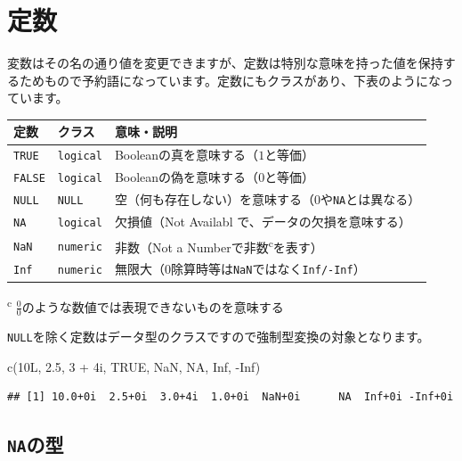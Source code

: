 \documentclass[
  12pt,
]{book}
\newenvironment{Shaded}{\begin{snugshade}}{\end{snugshade}}
\newcommand{\ConstantTok}[1]{\textcolor[rgb]{0.00,0.00,0.00}{#1}}
\newcommand{\DecValTok}[1]{\textcolor[rgb]{0.00,0.00,0.81}{#1}}
\newcommand{\FloatTok}[1]{\textcolor[rgb]{0.00,0.00,0.81}{#1}}
\newcommand{\FunctionTok}[1]{\textcolor[rgb]{0.00,0.00,0.00}{#1}}
\newcommand{\NormalTok}[1]{#1}
\newcommand{\SpecialCharTok}[1]{\textcolor[rgb]{0.00,0.00,0.00}{#1}}
\begin{document}
\hypertarget{ux5b9aux6570}{%
\section{定数}\label{ux5b9aux6570}}

変数はその名の通り値を変更できますが、定数は特別な意味を持った値を保持するためもので予約語になっています。定数にもクラスがあり、下表のようになっています。

\begin{longtable}[]{@{}lll@{}}
\toprule
定数 & クラス & 意味・説明 \\
\midrule
\endhead
\texttt{TRUE} & \texttt{logical} & Booleanの真を意味する（\(1\)と等価） \\
\texttt{FALSE} & \texttt{logical} & Booleanの偽を意味する（\(0\)と等価） \\
\texttt{NULL} & \texttt{NULL} & 空（何も存在しない）を意味する（\(0\)や\texttt{NA}とは異なる） \\
\texttt{NA} & \texttt{logical} & 欠損値（Not Availabl で、データの欠損を意味する） \\
\texttt{NaN} & \texttt{numeric} & 非数（Not a Numberで非数\textsuperscript{c}を表す） \\
\texttt{Inf} & \texttt{numeric} & 無限大（\(0\)除算時等は\texttt{NaN}ではなく\texttt{Inf/-Inf}） \\
\bottomrule
\end{longtable}

\textsuperscript{c} \(\frac{0}{0}\)のような数値では表現できないものを意味する

\texttt{NULL}を除く定数はデータ型のクラスですので強制型変換の対象となります。

\begin{Shaded}
\begin{Highlighting}[numbers=left,,]
\FunctionTok{c}\NormalTok{(10L, }\FloatTok{2.5}\NormalTok{, }\DecValTok{3} \SpecialCharTok{+}\NormalTok{ 4i, }\ConstantTok{TRUE}\NormalTok{, }\ConstantTok{NaN}\NormalTok{, }\ConstantTok{NA}\NormalTok{, }\ConstantTok{Inf}\NormalTok{, }\SpecialCharTok{{-}}\ConstantTok{Inf}\NormalTok{)}
\end{Highlighting}
\end{Shaded}

\begin{verbatim}
## [1] 10.0+0i  2.5+0i  3.0+4i  1.0+0i  NaN+0i      NA  Inf+0i -Inf+0i
\end{verbatim}

\hypertarget{naux306eux578b}{%
\subsection{\texorpdfstring{\texttt{NA}の型}{NAの型}}\label{naux306eux578b}}
\end{document}
